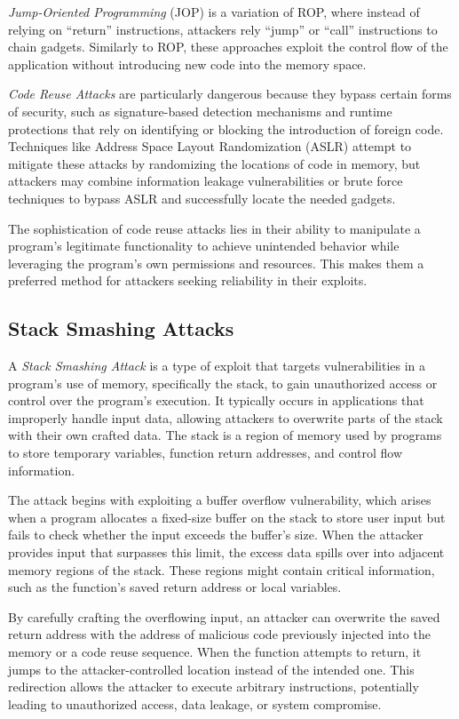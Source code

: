 \textit{Jump-Oriented Programming} (JOP) is a variation of ROP, where instead of
relying on ``return'' instructions, attackers rely ``jump'' or ``call''
instructions to chain gadgets. Similarly to ROP, these approaches exploit the
control flow of the application without introducing new code into the memory
space.

\textit{Code Reuse Attacks} are particularly dangerous because they bypass certain
forms of security, such as signature-based detection mechanisms and runtime
protections that rely on identifying or blocking the introduction of foreign
code. Techniques like Address Space Layout Randomization (ASLR) attempt to mitigate
these attacks by randomizing the locations of code in memory, but attackers may
combine information leakage vulnerabilities or brute force techniques to bypass
ASLR and successfully locate the needed gadgets.

The sophistication of code reuse attacks lies in their ability to manipulate a
program's legitimate functionality to achieve unintended behavior while
leveraging the program's own permissions and resources. This makes them a preferred
method for attackers seeking reliability in their exploits.

\subsection{Stack Smashing Attacks}
\label{subsec:background_stacksmashing}

A \textit{Stack Smashing Attack} is a type of exploit that targets vulnerabilities
in a program's use of memory, specifically the stack, to gain unauthorized access
or control over the program's execution. It typically occurs in applications
that improperly handle input data, allowing attackers to overwrite parts of the stack
with their own crafted data. The stack is a region of memory used by programs to
store temporary variables, function return addresses, and control flow
information.

The attack begins with exploiting a buffer overflow vulnerability, which arises when
a program allocates a fixed-size buffer on the stack to store user input but fails
to check whether the input exceeds the buffer's size. When the attacker provides
input that surpasses this limit, the excess data spills over into adjacent memory
regions of the stack. These regions might contain critical information, such as the
function's saved return address or local variables.

By carefully crafting the overflowing input, an attacker can overwrite the saved
return address with the address of malicious code previously injected into the
memory or a code reuse sequence. When the function attempts to return, it jumps
to the attacker-controlled location instead of the intended one. This redirection
allows the attacker to execute arbitrary instructions, potentially leading to
unauthorized access, data leakage, or system compromise.

